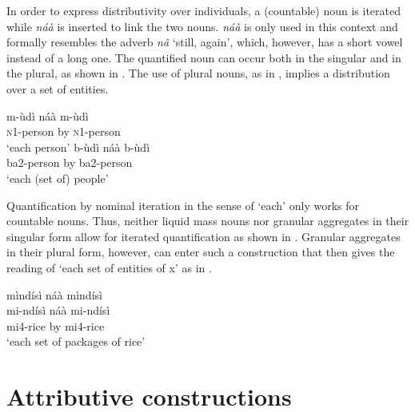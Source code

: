 In order to express distributivity over individuals, a (countable) noun is iterated while {\itshape náà} is inserted to link the two nouns. {\itshape náà} is only used in this context and formally resembles the adverb {\itshape nâ} `still, again', which, however, has a short vowel instead of a long one.  
The quantified noun can occur both in the singular and in the plural, as shown in . The use of plural nouns, as in , implies a distribution over a set of entities.

\ea\label{each}
\ea \label{each1}
 \gll  m-ùdì  náà m-ùdì \\
          \textsc{n}1-person by \textsc{n}1-person  \\
    \trans `each person'
\ex \label{each2}
  \gll    b-ùdì  náà b-ùdì \\
             ba2-person by ba2-person \\
    \trans `each (set of) people'
\z
\z

Quantification by nominal iteration in the sense of `each' only works for countable nouns. Thus, neither liquid mass nouns nor granular aggregates in their singular form allow for iterated quantification as shown in . Granular aggregates in their plural form, however, can enter such a construction that then gives the reading of `each set of entities of x' as in .

\ea\label{noeach}
\ex \label{noeach3}
  \glll mìndísì náà mìndísì \\
       mi-ndísì náà mi-ndísì \\
              mi4-rice by mi4-rice \\
    \trans `each set of packages of rice'
\z
\z




\section{Attributive constructions}
\label{sec:CONC}

